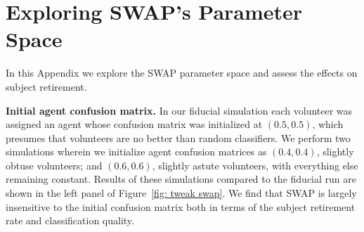 \documentclass[twocolumn,  trackchanges,]{aastex6}%
\begin{document}



\appendix
\label{sec:Appendix}


\section{Exploring SWAP's Parameter Space} \label{sec: tweaking swap}

In this Appendix we explore the SWAP parameter space and assess the effects on subject retirement. 


\textbf{Initial agent confusion matrix.} 
In our fiducial simulation each volunteer was assigned an agent whose confusion matrix was
initialized at $(0.5, 0.5)$, which presumes that volunteers are no better than random classifiers.  
We perform two simulations wherein we initialize agent confusion matrices as $(0.4, 0.4)$, 
slightly obtuse volunteers; and $(0.6, 0.6)$, slightly astute volunteers, with everything else remaining constant.  
Results of these simulations compared to the fiducial run are shown in the left panel of
Figure~\ref{fig: tweak swap}. We find that SWAP is largely insensitive to the 
initial confusion matrix  both in terms of the subject retirement rate and classification quality.  
\end{document}
